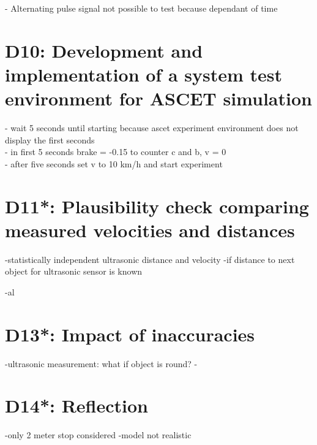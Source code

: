 - Alternating pulse signal not possible to test because dependant of time 

\chapter{D10: Development and implementation of a system test environment for ASCET simulation}\label{cha:D10}

- wait 5 seconds until starting because ascet experiment environment does not display the first seconds \\
- in first 5 seconds brake = -0.15 to counter c and b, v = 0 \\
- after five seconds set v to 10 km/h and start experiment

\chapter{D11*: Plausibility check comparing measured velocities and distances}\label{cha:D11}
-statistically independent ultrasonic distance and velocity
-if distance to next object for ultrasonic sensor is known

-al
\chapter{D13*: Impact of inaccuracies}\label{cha:D13}
-ultrasonic measurement: what if object is round?
-
\chapter{D14*: Reflection}\label{cha:D14}
-only 2 meter stop considered
-model not realistic